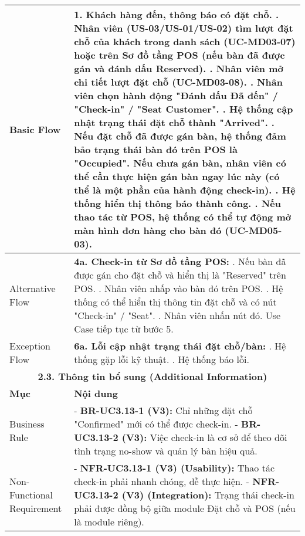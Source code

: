 \begin{longtable}{|m{4cm}|p{11cm}|}
Basic Flow & 1. Khách hàng đến, thông báo có đặt chỗ. \newline 2. Nhân viên (US-03/US-01/US-02) tìm lượt đặt chỗ của khách trong danh sách (UC-MD03-07) hoặc trên Sơ đồ tầng POS (nếu bàn đã được gán và đánh dấu Reserved). \newline 3. Nhân viên mở chi tiết lượt đặt chỗ (UC-MD03-08). \newline 4. Nhân viên chọn hành động "Đánh dấu Đã đến" / "Check-in" / "Seat Customer". \newline 5. Hệ thống cập nhật trạng thái đặt chỗ thành "Arrived". \newline 6. Nếu đặt chỗ đã được gán bàn, hệ thống đảm bảo trạng thái bàn đó trên POS là "Occupied". Nếu chưa gán bàn, nhân viên có thể cần thực hiện gán bàn ngay lúc này (có thể là một phần của hành động check-in). \newline 7. Hệ thống hiển thị thông báo thành công. \newline 8. Nếu thao tác từ POS, hệ thống có thể tự động mở màn hình đơn hàng cho bàn đó (UC-MD05-03). \\
\hline
Alternative Flow & \textbf{4a. Check-in từ Sơ đồ tầng POS:} \newline    1. Nếu bàn đã được gán cho đặt chỗ và hiển thị là "Reserved" trên POS. \newline    2. Nhân viên nhấp vào bàn đó trên POS. \newline    3. Hệ thống có thể hiển thị thông tin đặt chỗ và có nút "Check-in" / "Seat". \newline    4. Nhân viên nhấn nút đó. Use Case tiếp tục từ bước 5. \\
\hline
Exception Flow & \textbf{6a. Lỗi cập nhật trạng thái đặt chỗ/bàn:} \newline    1. Hệ thống gặp lỗi kỹ thuật. \newline    2. Hệ thống báo lỗi. \\
\hline
\multicolumn{2}{|c|}{\textbf{2.3. Thông tin bổ sung (Additional Information)}} \\
\hline
\textbf{Mục} & \textbf{Nội dung} \\
\hline
Business Rule & - \textbf{BR-UC3.13-1 (V3):} Chỉ những đặt chỗ "Confirmed" mới có thể được check-in. \newline - \textbf{BR-UC3.13-2 (V3):} Việc check-in là cơ sở để theo dõi tình trạng no-show và quản lý bàn hiệu quả. \\
\hline
Non-Functional Requirement & - \textbf{NFR-UC3.13-1 (V3) (Usability):} Thao tác check-in phải nhanh chóng, dễ thực hiện. \newline - \textbf{NFR-UC3.13-2 (V3) (Integration):} Trạng thái check-in phải được đồng bộ giữa module Đặt chỗ và POS (nếu là module riêng). \\
\hline
\end{longtable}

